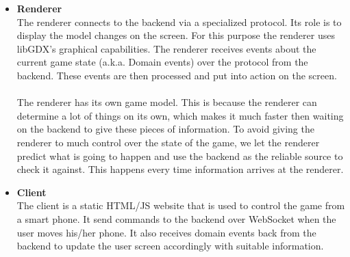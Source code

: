\documentclass[11pt,a4paper]{article}
\begin{document}
\begin{itemize}
\item \textbf{Renderer} \\
The renderer connects to the backend via a specialized protocol. Its role is to display the model changes on the screen. For this purpose the renderer uses libGDX's graphical capabilities. The renderer receives events about the current game state (a.k.a. Domain events) over the protocol from the backend. These events are then processed and put into action on the screen.\\
\\
The renderer has its own game model. This is because the renderer can determine a lot of things on its own, which makes it much faster then waiting on the backend to give these pieces of information. To avoid giving the renderer to much control over the state of the game, we let the renderer predict what is going to happen and use the backend as the reliable source to check it against. This happens every time information arrives at the renderer.

\item \textbf{Client} \\
The client is a static HTML/JS website that is used to control the game from a smart phone. It send commands to the backend over WebSocket when the user moves his/her phone. It also receives domain events back from the backend to update the user screen accordingly with suitable information.


\end{itemize}
\end{document}

